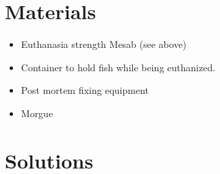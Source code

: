 \documentclass[
  letterpaper,
  DIV=11,
  numbers=noendperiod]{scrreprt}
\providecommand{\tightlist}{%
  \setlength{\itemsep}{0pt}\setlength{\parskip}{0pt}}\usepackage{longtable,booktabs,array}
\begin{document}
\hypertarget{materials-57}{%
\section{Materials}\label{materials-57}}

\begin{itemize}
\tightlist
\item
  Euthanasia strength Mesab (see above)
\item
  Container to hold fish while being euthanized.
\item
  Post mortem fixing equipment
\item
  Morgue
\end{itemize}

\hypertarget{solutions-47}{%
\section{Solutions}\label{solutions-47}}
\end{document}
